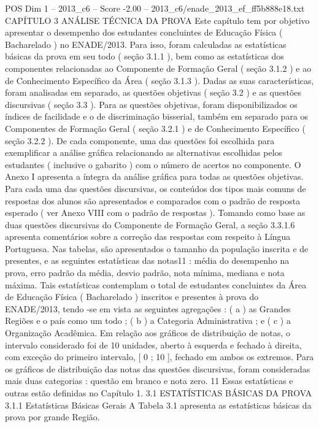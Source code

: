 \begin{textsample}{POS Dim 1 – 2013\_c6 – Score -2.00 – 2013\_c6/enade\_2013\_ef\_ff5b888e18.txt}  \label{ex:f1_pos_178}
CAPÍTULO 3 ANÁLISE TÉCNICA DA PROVA Este capítulo tem por objetivo apresentar o desempenho dos estudantes concluintes de Educação Física ( Bacharelado ) no ENADE/2013.
Para isso, foram calculadas as estatísticas básicas da prova em seu todo ( seção 3.1.1 ), bem como as estatísticas dos componentes relacionadas ao Componente de Formação Geral ( seção 3.1.2 ) e ao de Conhecimento Específico da Área ( seção 3.1.3 ).
Dadas as suas características, foram analisadas em separado, as questões objetivas ( seção 3.2 ) e as questões discursivas ( seção 3.3 ).
Para as questões objetivas, foram disponibilizados os índices de facilidade e o de discriminação bisserial, também em separado para os Componentes de Formação Geral ( seção 3.2.1 ) e de Conhecimento Específico ( seção 3.2.2 ).
De cada componente, uma das questões foi escolhida para exemplificar a análise gráfica relacionando as alternativas escolhidas pelos estudantes ( inclusive o gabarito ) com o número de acertos no componente.
O Anexo I apresenta a íntegra da análise gráfica para todas as questões objetivas.
Para cada uma das questões discursivas, os conteúdos dos tipos mais comuns de respostas dos alunos são apresentados e comparados com o padrão de resposta esperado ( ver Anexo VIII com o padrão de respostas ).
Tomando como base as duas questões discursivas do Componente de Formação Geral, a seção 3.3.1.6 apresenta comentários sobre a correção das respostas com respeito à Língua Portuguesa.
Nas tabelas, são apresentados o tamanho da população inscrita e de presentes, e as seguintes estatísticas das notas11 : média do desempenho na prova, erro padrão da média, desvio padrão, nota mínima, mediana e nota máxima.
Tais estatísticas contemplam o total de estudantes concluintes da Área de Educação Física ( Bacharelado ) inscritos e presentes à prova do ENADE/2013, tendo -se em vista as seguintes agregações : ( a ) as Grandes Regiões e o país como um todo ; ( b ) a Categoria Administrativa ; e ( c ) a Organização Acadêmica.
Em relação aos gráficos de distribuição de notas, o intervalo considerado foi de 10 unidades, aberto à esquerda e fechado à direita, com exceção do primeiro intervalo, [ 0 ; 10 ], fechado em ambos os extremos.
Para os gráficos de distribuição das notas das questões discursivas, foram consideradas mais duas categorias : questão em branco e nota zero. 11 Essas estatísticas e outras estão definidas no Capítulo 1. 3.1 ESTATÍSTICAS BÁSICAS DA PROVA 3.1.1 Estatísticas Básicas Gerais A Tabela 3.1 apresenta as estatísticas básicas da prova por grande Região.

\end{textsample}
